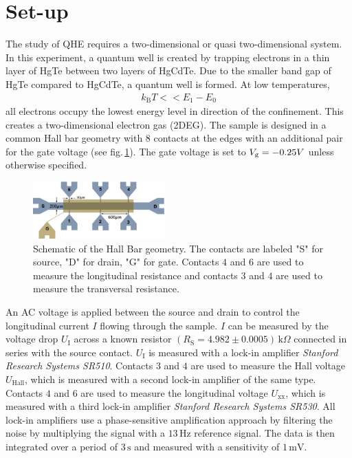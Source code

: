 \section{Set-up}\label{sec:setup}
The study of QHE requires a two-dimensional or quasi two-dimensional system.
In this experiment, a quantum well is created by trapping electrons in a thin layer of HgTe between two layers of HgCdTe. Due to the smaller band gap of HgTe compared to HgCdTe, a quantum well is formed. 
At low temperatures, 
\begin{align}
    k_\text{B}T << E_1-E_0
\end{align}
all electrons occupy the lowest energy level in direction of the confinement. 
This creates a two-dimensional electron gas (2DEG).
The sample is designed in a common Hall bar geometry with $8$ contacts at the edges with an additional pair for the gate voltage (see fig.\,\ref{fig:HallBar}).
The gate voltage is set to $V_\text g = -0.25V$ unless otherwise specified.
\begin{figure}[h]
    \centering
    \includegraphics[width=0.45\textwidth]{../Images/HallBar.png}
    \caption{Schematic of the Hall Bar geometry. The contacts are labeled "S" 
    for source, "D" for drain, "G" for gate. Contacts $4$ and $6$ are used to 
    measure the longitudinal resistance and contacts $3$ and $4$ are used to measure 
    the transversal resistance.}
    \label{fig:HallBar}
\end{figure}
An AC voltage is applied between the source and drain to control the longitudinal current $I$ flowing through the sample. 
$I$ can be measured by the voltage drop $U_\text{I}$ across a known resistor 
$(R_\text{S}=4.982\pm0.0005)\,\text{k}\Omega$ connected in series with the source contact. 
$U_\text{I}$ is measured with a lock-in amplifier \emph{Stanford Research Systems SR510}. 
Contacts $3$ and $4$ are used to measure the Hall voltage $U_\text{Hall}$, which is measured with a second lock-in amplifier of the same type. 
Contacts $4$ and $6$ are used to measure the longitudinal voltage $U_\text{xx}$, which is measured with a third lock-in amplifier \emph{Stanford Research Systems SR530}.
All lock-in amplifiers use a phase-sensitive amplification approach by filtering the noise by multiplying the signal with a $13\,\text{Hz}$ reference signal. The data is then integrated over a period of $3\,\text{s}$ and measured with a sensitivity of $1\,\text{mV}$.
